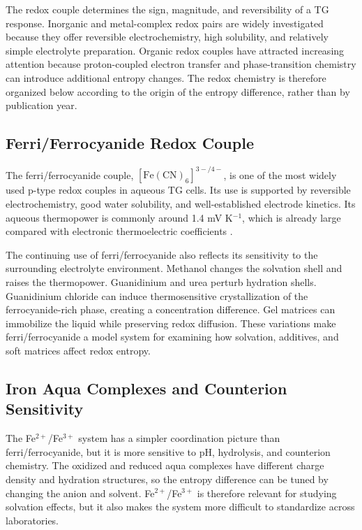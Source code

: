 \documentclass[a4paper,12pt]{report}
\begin{document}
The redox couple determines the sign, magnitude, and reversibility of a TG
response. Inorganic and metal-complex redox pairs are widely investigated
because they offer reversible electrochemistry, high solubility, and relatively
simple electrolyte preparation. Organic redox couples have attracted increasing
attention because proton-coupled electron transfer and phase-transition
chemistry can introduce additional entropy changes. The redox chemistry is
therefore organized below according to the origin of the entropy difference,
rather than by publication year.

\subsection{Ferri/Ferrocyanide Redox Couple}

The ferri/ferrocyanide couple, $[\mathrm{Fe(CN)}_6]^{3-/4-}$, is one of the
most widely used p-type redox couples in aqueous TG cells. Its use is supported
by reversible electrochemistry, good water solubility, and well-established
electrode kinetics. Its aqueous thermopower is commonly around 1.4 mV K$^{-1}$,
which is already large compared with electronic thermoelectric coefficients
\citep{duan2018aqueous}.

The continuing use of ferri/ferrocyanide also reflects its sensitivity to the
surrounding electrolyte environment. Methanol changes the solvation shell and
raises the thermopower. Guanidinium and urea perturb hydration shells.
Guanidinium chloride can induce thermosensitive crystallization of the
ferrocyanide-rich phase, creating a concentration difference. Gel matrices can
immobilize the liquid while preserving redox diffusion. These variations make
ferri/ferrocyanide a model system for examining how solvation, additives, and
soft matrices affect redox entropy.

\subsection{Iron Aqua Complexes and Counterion Sensitivity}

The Fe$^{2+}$/Fe$^{3+}$ system has a simpler coordination picture than
ferri/ferrocyanide, but it is more sensitive to pH, hydrolysis, and counterion
chemistry. The oxidized and reduced aqua complexes have different charge
density and hydration structures, so the entropy difference can be tuned by
changing the anion and solvent. Fe$^{2+}$/Fe$^{3+}$ is therefore relevant for
studying solvation effects, but it also makes the system more difficult to
standardize across laboratories.
\end{document}
